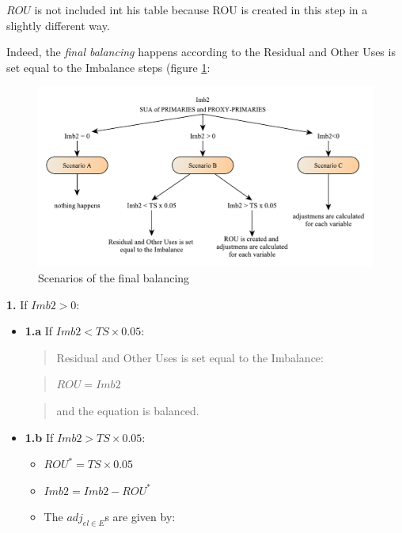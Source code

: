 \documentclass[]{article}
\providecommand{\tightlist}{%
  \setlength{\itemsep}{0pt}\setlength{\parskip}{0pt}}
\begin{document}
\(ROU\) is not included int his table because ROU is created in this
step in a slightly different way.

Indeed, the \emph{final balancing} happens according to the Residual and
Other Uses is set equal to the Imbalance steps (figure \ref{fig:f10}:

\begin{figure}[H]

{\centering \includegraphics[width=1\linewidth]{images/StandBal/11_ScenariosFinalBal} 

}

\caption{\label{fig:f10}Scenarios of the final balancing}\label{fig:f10}
\end{figure}

\textbf{1.} If \(Imb2 > 0\):

\begin{itemize}
\item
  \textbf{1.a} If \(Imb2 < TS \times 0.05\):

  \begin{quote}
  Residual and Other Uses is set equal to the Imbalance:
  \end{quote}

  \begin{quote}
  \(ROU = Imb2\)
  \end{quote}

  \begin{quote}
  and the equation is balanced.
  \end{quote}
\item
  \textbf{1.b} If \(Imb2 > TS \times 0.05\):

  \begin{itemize}
  \tightlist
  \item
    \(ROU^* = TS \times 0.05\)
  \item
    \(Imb2 = Imb2 - ROU^*\)
  \item
    The \emph{\(adj_{el \in E}\)}s are given by:
  \end{itemize}
\end{itemize}
\end{document}
